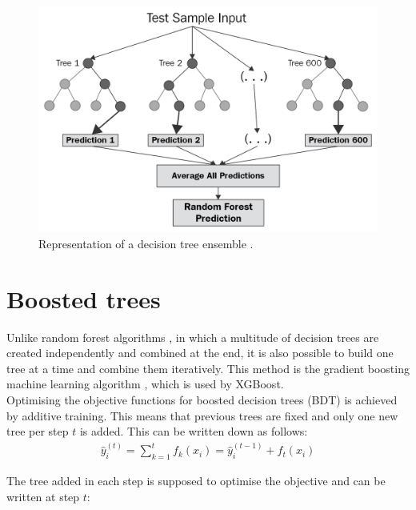 \begin{figure}
  \centering
  \includegraphics[height=0.6\textwidth]{images/random_forest.png}
  \caption{Representation of a decision tree ensemble \cite{random_forest}.}
  \label{fig:random_forest}
\end{figure}

\section{Boosted trees}
Unlike random forest algorithms \cite{random}, in which a multitude of decision trees are created independently and combined at the end,
it is also possible to build one tree at a time and
combine them iteratively. This method is the gradient boosting machine learning algorithm \cite{gradient}, which is used by XGBoost. \\
Optimising the objective functions for
boosted decision trees (BDT) is achieved by additive training. This means that previous trees are fixed and only one new tree per step $t$ is added.
This can be written
down as follows:
\begin{align}
  \hat{y}_i^{(t)} = \sum_{k=1}^t f_k(x_i) = \hat{y}_i^{(t-1)} + f_t(x_i)
\end{align}

The tree added in each step is supposed to optimise the objective and can be written at step $t$:

